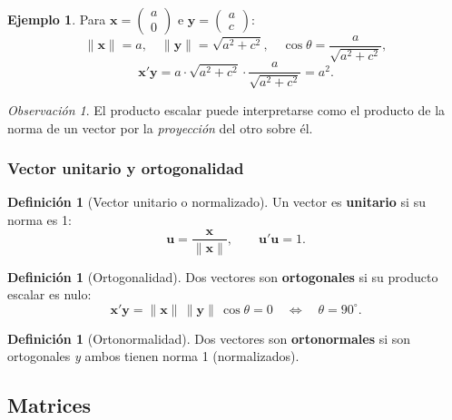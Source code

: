 \documentclass[12pt, a4paper]{article}
\theoremstyle{plain}
\theoremstyle{definition}
\newtheorem{definicion}[teorema]{Definición}
\newtheorem{ejemplo}{Ejemplo}[section]
\theoremstyle{remark}
\newtheorem*{observacion}{Observación}
\begin{document}
\begin{ejemplo}
Para $\mathbf{x} = \begin{pmatrix}a\\0\end{pmatrix}$ e
$\mathbf{y} = \begin{pmatrix}a\\c\end{pmatrix}$:
\[
  \|\mathbf{x}\| = a,\quad
  \|\mathbf{y}\| = \sqrt{a^2+c^2},\quad
  \cos\theta = \frac{a}{\sqrt{a^2+c^2}},
\]
\[
  \mathbf{x}'\mathbf{y} = a\cdot\sqrt{a^2+c^2}\cdot\frac{a}{\sqrt{a^2+c^2}} = a^2.
\]
\end{ejemplo}

\begin{observacion}
El producto escalar puede interpretarse como el producto de la norma de un
vector por la \emph{proyección} del otro sobre él.
\end{observacion}

\subsubsection{Vector unitario y ortogonalidad}

\begin{definicion}[Vector unitario o normalizado]
Un vector es \textbf{unitario} si su norma es 1:
\[
  \mathbf{u} = \frac{\mathbf{x}}{\|\mathbf{x}\|}, \qquad \mathbf{u}'\mathbf{u} = 1.
\]
\end{definicion}

\begin{definicion}[Ortogonalidad]
Dos vectores son \textbf{ortogonales} si su producto escalar es nulo:
\[
  \mathbf{x}'\mathbf{y} = \|\mathbf{x}\|\,\|\mathbf{y}\|\,\cos\theta = 0
  \quad\Longleftrightarrow\quad \theta = 90^\circ.
\]
\end{definicion}

\begin{definicion}[Ortonormalidad]
Dos vectores son \textbf{ortonormales} si son ortogonales \emph{y} ambos
tienen norma 1 (normalizados).
\end{definicion}

\subsection{Matrices}
\end{document}
